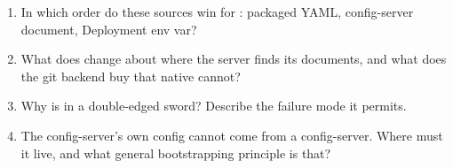 \begin{quiz}
\begin{enumerate}
  \item In which order do these sources win for
  : packaged YAML, config-server document,
  Deployment env var?
  \item What does  change about where the
  server finds its documents, and what does the git backend buy that
  native cannot?
  \item Why is  in  a
  double-edged sword? Describe the failure mode it permits.
  \item The config-server's own config cannot come from a config-server.
  Where must it live, and what general bootstrapping principle is that?
\end{enumerate}
\end{quiz}
